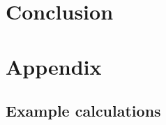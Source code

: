 \documentclass{article}
\begin{document}
\newpage
\section{Conclusion}

\newpage
\section{Appendix}
\subsection{Example calculations}
\end{document}
